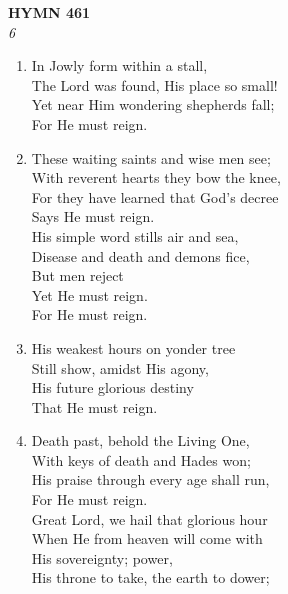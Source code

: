 \documentclass[11pt,a4paper]{article}
\begin{document}
\newpage
\begin{center}
    {\Large \textbf{HYMN 461}}
    \\
    \textit{6}
\end{center}
\vspace{1em}

\begin{enumerate}
    \item In Jowly form within a stall, \\
        The Lord was found, His place so small! \\
        Yet near Him wondering shepherds fall; \\
        For He must reign.

    \item These waiting saints and wise men see; \\
        With reverent hearts they bow the knee, \\
        For they have learned that God's decree \\
        Says He must reign. \\
        His simple word stills air and sea, \\
        Disease and death and demons fice, \\
        But men reject \\
        Yet He must reign. \\
        For He must reign.

    \item His weakest hours on yonder tree \\
        Still show, amidst His agony, \\
        His future glorious destiny \\
        That He must reign.

    \item Death past, behold the Living One, \\
        With keys of death and Hades won; \\
        His praise through every age shall run, \\
        For He must reign. \\
        Great Lord, we hail that glorious hour \\
        When He from heaven will come with \\
        His sovereignty; power, \\
        His throne to take, the earth to dower;

\end{enumerate}
\end{document}

